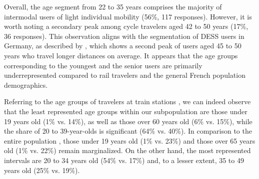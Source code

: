 \begin{refsegment}
Overall, the age segment from 22 to 35 years comprises the majority of intermodal users of light individual mobility (56\%, 117 responses). However, it is worth noting a secondary peak among cycle travelers aged 42 to 50 years (17\%, 36 responses). This observation aligns with the segmentation of \acrshort{DESS} users in Germany, as described by \textcolor{blue}{\textcite[4]{degele_identifying_2018}}, which shows a second peak of users aged 45 to 50 years who travel longer distances on average. It appears that the age groups corresponding to the youngest and the senior users are primarily underrepresented compared to rail travelers and the general French population demographics.%

Referring to the age groups of travelers at train stations \textcolor{blue}{\autocite{sncf_repartition_2017}}, we can indeed observe that the least represented age groups within our subpopulation are those under 19 years old (1\% vs. 14\%), as well as those over 60 years old (6\% vs. 15\%), while the share of 20 to 39-year-olds is significant (64\% vs. 40\%). In comparison to the entire population \textcolor{blue}{\autocite{insee_age_2022}}, those under 19 years old (1\% vs. 23\%) and those over 65 years old (1\% vs. 22\%) remain marginalized. On the other hand, the most represented intervals are 20 to 34 years old (54\% vs. 17\%) and, to a lesser extent, 35 to 49 years old (25\% vs. 19\%).%


\end{refsegment}

